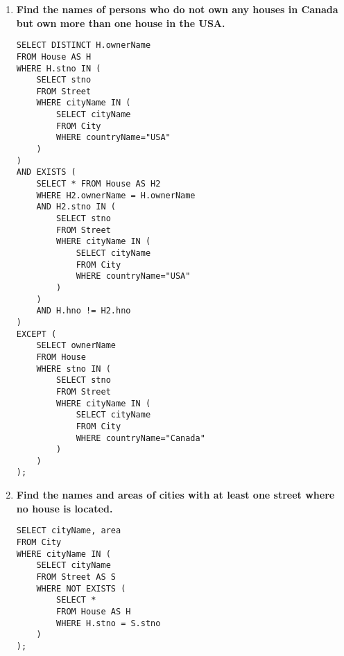 \documentclass{article}
\begin{document}
\begin{enumerate}
\item \textbf{Find the names of persons who do not own any houses in Canada but own more than one house in the USA.}
\begin{verbatim}
SELECT DISTINCT H.ownerName 
FROM House AS H 
WHERE H.stno IN (
    SELECT stno 
    FROM Street 
    WHERE cityName IN (
        SELECT cityName 
        FROM City 
        WHERE countryName="USA"
    )
) 
AND EXISTS (
    SELECT * FROM House AS H2 
    WHERE H2.ownerName = H.ownerName 
    AND H2.stno IN (
        SELECT stno 
        FROM Street 
        WHERE cityName IN (
            SELECT cityName 
            FROM City 
            WHERE countryName="USA"
        )
    ) 
    AND H.hno != H2.hno
) 
EXCEPT (
    SELECT ownerName 
    FROM House 
    WHERE stno IN (
        SELECT stno 
        FROM Street 
        WHERE cityName IN (
            SELECT cityName 
            FROM City 
            WHERE countryName="Canada"
        )
    )
);
\end{verbatim}

\newpage

\item \textbf{Find the names and areas of cities with at least one street where no house is located.}
\begin{verbatim}
SELECT cityName, area 
FROM City 
WHERE cityName IN (
    SELECT cityName 
    FROM Street AS S 
    WHERE NOT EXISTS (
        SELECT * 
        FROM House AS H 
        WHERE H.stno = S.stno
    )
);
\end{verbatim}
\end{enumerate}
\end{document}
